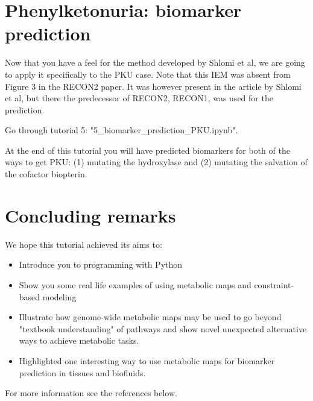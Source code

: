 \documentclass{article}
\begin{document}
\section{Phenylketonuria: biomarker prediction}
Now that you have a feel for the method developed by Shlomi et al, we are going to apply it specifically to the PKU case. Note that this IEM was absent from Figure 3 in the RECON2 paper. It was however present in the article by Shlomi et al, but there the predecessor of RECON2, RECON1, was used for the prediction.

\begin{tcolorbox}[width=\textwidth,colback={yellow},title={ASSIGNMENT},coltitle=white]

Go through tutorial 5: "5\_biomarker\_prediction\_PKU.ipynb".

At the end of this tutorial you will have predicted biomarkers for both of the ways to get PKU: (1) mutating the hydroxylase and (2) mutating the salvation of the cofactor biopterin.

\end{tcolorbox}

\section{Concluding remarks}
We hope this tutorial achieved its aims to:
\begin{itemize}
\item Introduce you to programming with Python
\item Show you some real life examples of using metabolic maps and constraint-based modeling
\item Illustrate how genome-wide metabolic maps may be used to go beyond "textbook understanding" of pathways and show novel unexpected alternative ways to achieve metabolic tasks.
\item Highlighted one interesting way to use metabolic maps for biomarker prediction in tissues and biofluids.
\end{itemize}

For more information see the references below.



\end{document}
